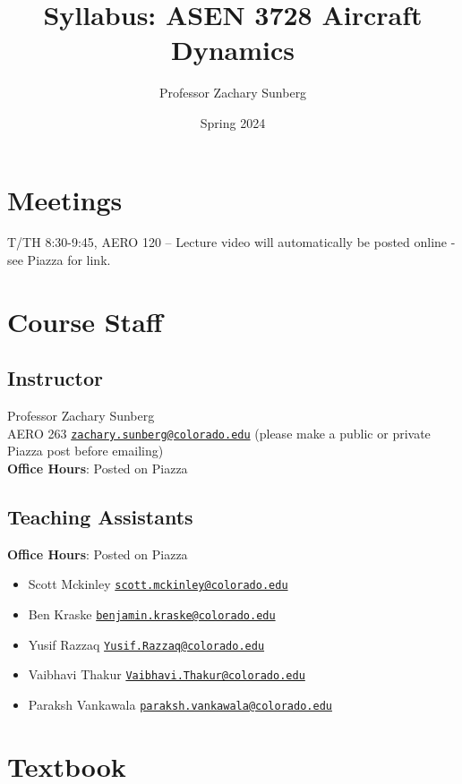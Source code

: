 \documentclass[9pt]{article}
\title{Syllabus: ASEN 3728 Aircraft Dynamics}
\author{Professor Zachary Sunberg}
\date{Spring 2024}
\begin{document}
\maketitle

\section*{Meetings}

T/TH 8:30-9:45, AERO 120 -- Lecture video will automatically be posted online - see Piazza for link.

\section*{Course Staff}

\subsection*{Instructor}
Professor Zachary Sunberg\\
AERO 263 \href{mailto://zachary.sunberg@colorado.edu}{\nolinkurl{zachary.sunberg@colorado.edu}} (please make a public or private Piazza post before emailing)\\
\textbf{Office Hours}: Posted on Piazza

\subsection*{Teaching Assistants}

\textbf{Office Hours}: Posted on Piazza

\begin{itemize}[noitemsep]
\item Scott Mckinley 
  \href{mailto:scott.mckinley@colorado.edu}{\nolinkurl{scott.mckinley@colorado.edu}}
\item Ben Kraske
  \href{mailto:benjamin.kraske@colorado.edu}{\nolinkurl{benjamin.kraske@colorado.edu}}
\item Yusif Razzaq
  \href{mailto:Yusif.Razzaq@colorado.edu}{\nolinkurl{Yusif.Razzaq@colorado.edu}}
\item Vaibhavi Thakur
  \href{mailto:Vaibhavi.Thakur@colorado.edu}{\nolinkurl{Vaibhavi.Thakur@colorado.edu}}
\item Paraksh Vankawala
  \href{mailto:paraksh.vankawala@colorado.edu}{\nolinkurl{paraksh.vankawala@colorado.edu}}
\end{itemize}

\section*{Textbook}
\end{document}
